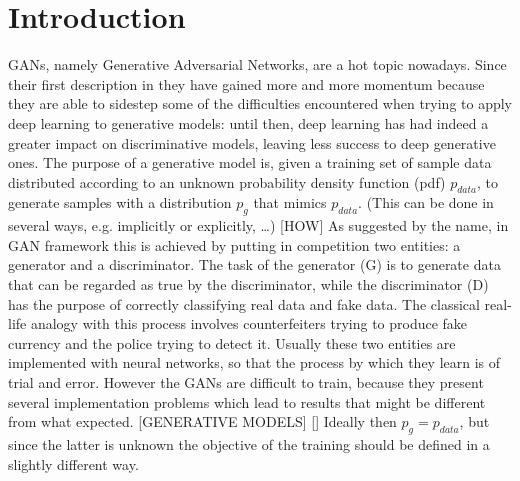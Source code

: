 
\section{Introduction}
\label{sec:introduction}

GANs, namely Generative Adversarial Networks, are a hot topic nowadays. Since their first description in \cite{} they have gained more and more momentum because they are able to sidestep some of the difficulties encountered when trying to apply deep learning to generative models: until then, deep learning has had indeed a greater impact on discriminative models, leaving less success to deep generative ones. The purpose of a generative model is, given a training set of sample data distributed according to an unknown probability density function (pdf) $p_{data}$, to generate samples with a distribution $p_g$ that mimics $p_{data}$. (This can be done in several ways, e.g. implicitly or explicitly, …)
[HOW] As suggested by the name, in GAN framework this is achieved by putting in competition two entities: a generator and a discriminator. The task of the generator (G) is to generate data that can be regarded as true by the discriminator, while the discriminator (D) has the purpose of correctly classifying real data and fake data. The classical real-life analogy with this process involves counterfeiters trying to produce fake currency and the police trying to detect it. Usually these two entities are implemented with neural networks, so that the process by which they learn is of trial and error. However the GANs are difficult to train, because they present several implementation problems which lead to results that might be different from what expected.
[GENERATIVE MODELS]
[] Ideally then $p_g = p_{data}$, but since the latter is unknown the objective of the training should be defined in a slightly different way. 
